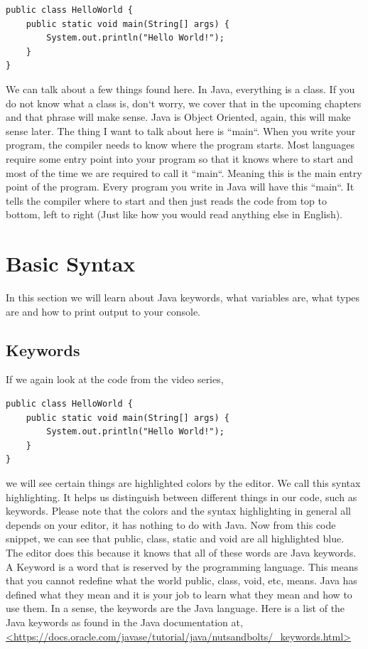 \documentclass[11]{article}
\begin{document}
\begin{lstlisting}
public class HelloWorld {
    public static void main(String[] args) {
        System.out.println("Hello World!");
    }
}
\end{lstlisting}

We can talk about a few things found here. In Java, everything is a class. If you do not know what a class is, don`t worry, we cover that in the upcoming chapters and that phrase will make sense. Java is Object Oriented, again, this will make sense later. The thing I want to talk about here is ``main``. When you write your program, the compiler needs to know where the program starts. Most languages require some entry point into your program so that it knows where to start and most of the time we are required to call it ``main``. Meaning this is the main entry point of the program. Every program you write in Java will have this ``main``. It tells the compiler where to start and then just reads the code from top to bottom, left to right (Just like how you would read anything else in English).

\section{Basic Syntax}
In this section we will learn about Java keywords, what variables are, what types are and how to print output to your console.
\subsection{Keywords}
If we again look at the code from the video series,
\begin{lstlisting}
public class HelloWorld {
    public static void main(String[] args) {
        System.out.println("Hello World!");
    }
}
\end{lstlisting}
we will see certain things are highlighted colors by the editor. We call this syntax highlighting. It helps us distinguish between different things in our code, such as keywords. Please note that the colors and the syntax highlighting in general all depends on your editor, it has nothing to do with Java. Now from this code snippet, we can see that public, class, static and void are all highlighted blue. The editor does this because it knows that all of these words are Java keywords.\\

A Keyword is a word that is reserved by the programming language. This means that you cannot redefine what the world public, class, void, etc, means. Java has defined what they mean and it is your job to learn what they mean and how to use them. In a sense, the keywords are the Java language. Here is a list of the Java keywords as found in the Java documentation at, \url{<https://docs.oracle.com/javase/tutorial/java/nutsandbolts/_keywords.html>}
\end{document}
